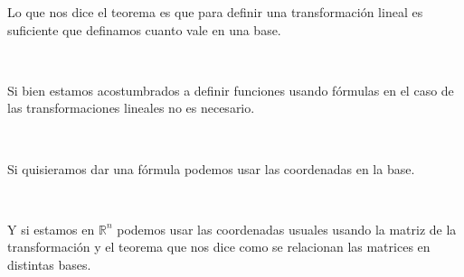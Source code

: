 \documentclass[handout]{beamer} %
\newcommand{\R}{\mathbb R}
\begin{document}
\begin{frame}
	
	\begin{observacion}
		
		Lo que nos dice el teorema es que para definir una transformación lineal es suficiente que definamos cuanto vale en una base.
		\pause
		
		\
		
		Si bien estamos acostumbrados a definir funciones usando fórmulas en el caso de las transformaciones lineales no es necesario.
		\pause
		
		\
		
		Si quisieramos dar una fórmula podemos usar las coordenadas en la base.
		\pause
		
		\
		
		Y si estamos en $\R^n$ podemos usar las coordenadas usuales usando la matriz de la transformación y el teorema que nos dice como se relacionan las matrices en distintas bases.
	\end{observacion}
	
	
\end{frame}
\end{document}
